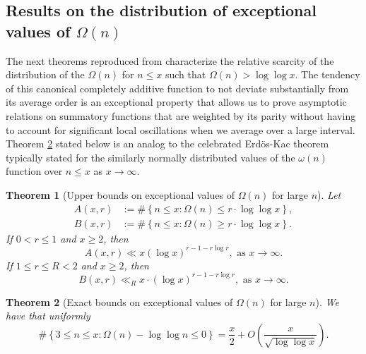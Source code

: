 \documentclass[11pt,reqno,a4letter]{article}
\numberwithin{figure}{section}
\numberwithin{table}{section}
\theoremstyle{plain}
\newtheorem{theorem}{Theorem}
\numberwithin{theorem}{section}
\theoremstyle{definition}
\begin{document}
\subsection{Results on the distribution of exceptional values of $\Omega(n)$} 

The next theorems reproduced from \cite[\S 7.4]{MV} characterize the relative 
scarcity of the distribution of the $\Omega(n)$ for $n \leq x$ such that 
$\Omega(n) > \log\log x$. The tendency of this canonical completely additive 
function to not deviate substantially from its average order is an exceptional 
property that allows us to prove asymptotic relations on summatory functions that 
are weighted by its parity without having to account for significant local 
oscillations when we average over a large interval. 
Theorem \ref{theorem_MV_Thm7.21-init_stmt} stated below is an analog to the 
celebrated Erd\"os-Kac theorem typically stated for the 
similarly normally distributed values of the $\omega(n)$ function over $n \leq x$ as 
$x \rightarrow \infty$. 

\begin{theorem}[Upper bounds on exceptional values of $\Omega(n)$ for large $n$] 
\label{theorem_MV_Thm7.20-init_stmt} 
Let 
\begin{align*} 
A(x, r) & := \#\left\{n \leq x: \Omega(n) \leq r \cdot \log\log x\right\}, \\ 
B(x, r) & := \#\left\{n \leq x: \Omega(n) \geq r \cdot \log\log x\right\}. 
\end{align*} 
If $0 < r \leq 1$ and $x \geq 2$, then 
\[
A(x, r) \ll x (\log x)^{r-1 - r\log r}, \text{ \ as\ } x \rightarrow \infty. 
\]
If $1 \leq r \leq R < 2$ and $x \geq 2$, then 
\[
B(x, r) \ll_R x \cdot (\log x)^{r-1-r \log r}, \text{ \ as\ } x \rightarrow \infty. 
\]
\end{theorem} 

\begin{theorem}[Exact bounds on exceptional values of $\Omega(n)$ for large $n$] 
\label{theorem_MV_Thm7.21-init_stmt} 
We have that uniformly 
\[
\#\left\{3 \leq n \leq x: \Omega(n) - \log\log n \leq 0\right\} = 
     \frac{x}{2} + O\left(\frac{x}{\sqrt{\log\log x}}\right). 
\]
\end{theorem} 
\end{document}
